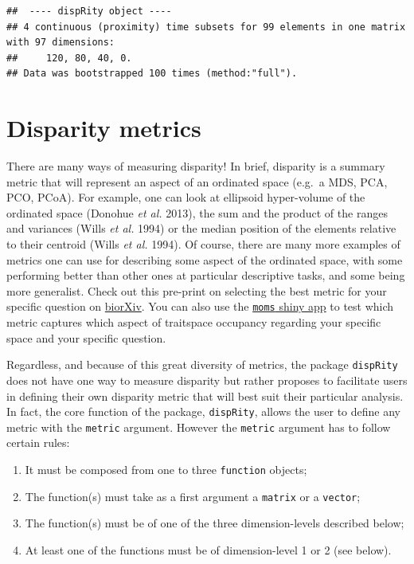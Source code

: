 \documentclass[]{book}
\providecommand{\tightlist}{%
  \setlength{\itemsep}{0pt}\setlength{\parskip}{0pt}}
\begin{document}
\begin{verbatim}
##  ---- dispRity object ---- 
## 4 continuous (proximity) time subsets for 99 elements in one matrix with 97 dimensions:
##     120, 80, 40, 0.
## Data was bootstrapped 100 times (method:"full").
\end{verbatim}

\hypertarget{disparity-metrics}{%
\section{Disparity metrics}\label{disparity-metrics}}

There are many ways of measuring disparity!
In brief, disparity is a summary metric that will represent an aspect of an ordinated space (e.g.~a MDS, PCA, PCO, PCoA).
For example, one can look at ellipsoid hyper-volume of the ordinated space (Donohue \emph{et al.} 2013), the sum and the product of the ranges and variances (Wills \emph{et al.} 1994) or the median position of the elements relative to their centroid (Wills \emph{et al.} 1994).
Of course, there are many more examples of metrics one can use for describing some aspect of the ordinated space, with some performing better than other ones at particular descriptive tasks, and some being more generalist.
Check out this pre-print on selecting the best metric for your specific question on \href{https://www.biorxiv.org/content/10.1101/801571v1}{biorXiv}.
You can also use the \href{https://tguillerme.shinyapps.io/moms/}{\texttt{moms} shiny app} to test which metric captures which aspect of traitspace occupancy regarding your specific space and your specific question.

Regardless, and because of this great diversity of metrics, the package \texttt{dispRity} does not have one way to measure disparity but rather proposes to facilitate users in defining their own disparity metric that will best suit their particular analysis.
In fact, the core function of the package, \texttt{dispRity}, allows the user to define any metric with the \texttt{metric} argument.
However the \texttt{metric} argument has to follow certain rules:

\begin{enumerate}
\def\labelenumi{\arabic{enumi}.}
\tightlist
\item
  It must be composed from one to three \texttt{function} objects;
\item
  The function(s) must take as a first argument a \texttt{matrix} or a \texttt{vector};
\item
  The function(s) must be of one of the three dimension-levels described below;
\item
  At least one of the functions must be of dimension-level 1 or 2 (see below).
\end{enumerate}
\end{document}
